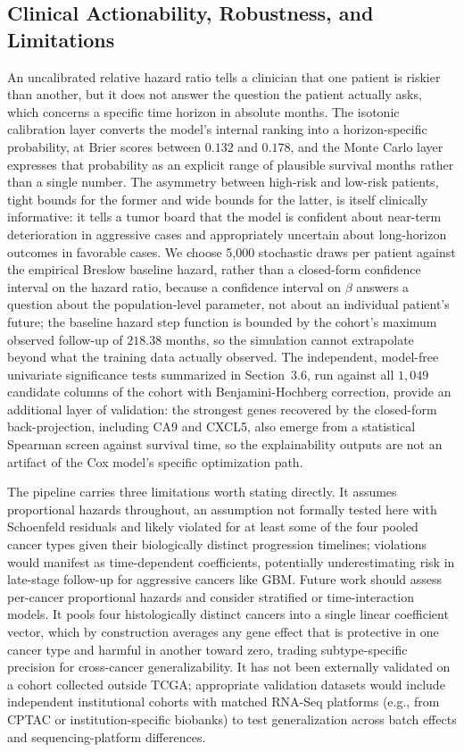 \documentclass[sigconf, review=true]{acmart}
\begin{document}
\subsection{Clinical Actionability, Robustness, and Limitations}
An uncalibrated relative hazard ratio tells a clinician that one patient is riskier than another, but it does not answer the question the patient actually asks, which concerns a specific time horizon in absolute months. The isotonic calibration layer converts the model's internal ranking into a horizon-specific probability, at Brier scores between $0.132$ and $0.178$, and the Monte Carlo layer expresses that probability as an explicit range of plausible survival months rather than a single number. The asymmetry between high-risk and low-risk patients, tight bounds for the former and wide bounds for the latter, is itself clinically informative: it tells a tumor board that the model is confident about near-term deterioration in aggressive cases and appropriately uncertain about long-horizon outcomes in favorable cases. We choose 5,000 stochastic draws per patient against the empirical Breslow baseline hazard, rather than a closed-form confidence interval on the hazard ratio, because a confidence interval on $\beta$ answers a question about the population-level parameter, not about an individual patient's future; the baseline hazard step function is bounded by the cohort's maximum observed follow-up of $218.38$ months, so the simulation cannot extrapolate beyond what the training data actually observed. The independent, model-free univariate significance tests summarized in Section~3.6, run against all $1{,}049$ candidate columns of the cohort with Benjamini-Hochberg correction, provide an additional layer of validation: the strongest genes recovered by the closed-form back-projection, including CA9 and CXCL5, also emerge from a statistical Spearman screen against survival time, so the explainability outputs are not an artifact of the Cox model's specific optimization path.

The pipeline carries three limitations worth stating directly. It assumes proportional hazards throughout, an assumption not formally tested here with Schoenfeld residuals \cite{schoenfeld1982partial} and likely violated for at least some of the four pooled cancer types given their biologically distinct progression timelines; violations would manifest as time-dependent coefficients, potentially underestimating risk in late-stage follow-up for aggressive cancers like GBM. Future work should assess per-cancer proportional hazards and consider stratified or time-interaction models. It pools four histologically distinct cancers into a single linear coefficient vector, which by construction averages any gene effect that is protective in one cancer type and harmful in another toward zero, trading subtype-specific precision for cross-cancer generalizability. It has not been externally validated on a cohort collected outside TCGA; appropriate validation datasets would include independent institutional cohorts with matched RNA-Seq platforms (e.g., from CPTAC or institution-specific biobanks) to test generalization across batch effects and sequencing-platform differences.
\end{document}
